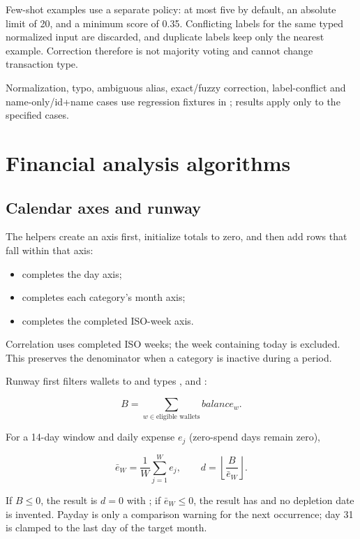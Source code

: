 Few-shot examples use a separate policy: at most five by default, an absolute limit of 20, and a minimum score of 0.35. Conflicting labels for the same typed normalized input are discarded, and duplicate labels keep only the nearest example. Correction therefore is not majority voting and cannot change transaction type.

Normalization, typo, ambiguous alias, exact/fuzzy correction, label-conflict and name-only/id+name cases use regression fixtures in ; results apply only to the specified cases.

\section{Financial analysis algorithms}
\label{app:analytics-algorithms}

\subsection{Calendar axes and runway}

The helpers create an axis first, initialize totals to zero, and then add rows that fall within that axis:
\begin{itemize}
  \item {} completes the day axis;
  \item {} completes each category's month axis;
  \item {} completes the completed ISO-week axis.
\end{itemize}
Correlation uses completed ISO weeks; the week containing today is excluded. This preserves the denominator when a category is inactive during a period.

Runway first filters wallets to  and types ,  and :

\begin{equation}
  B=\sum_{w\in\text{eligible wallets}} balance_w.
\end{equation}

For a 14-day window and daily expense $e_j$ (zero-spend days remain zero),

\begin{equation}
  \bar e_W=\frac{1}{W}\sum_{j=1}^{W}e_j,
  \qquad d=\left\lfloor\frac{B}{\bar e_W}\right\rfloor.
\end{equation}

If $B\leq0$, the result is $d=0$ with ; if $\bar e_W\leq0$, the result has  and no depletion date is invented. Payday is only a comparison warning for the next occurrence; day 31 is clamped to the last day of the target month.

